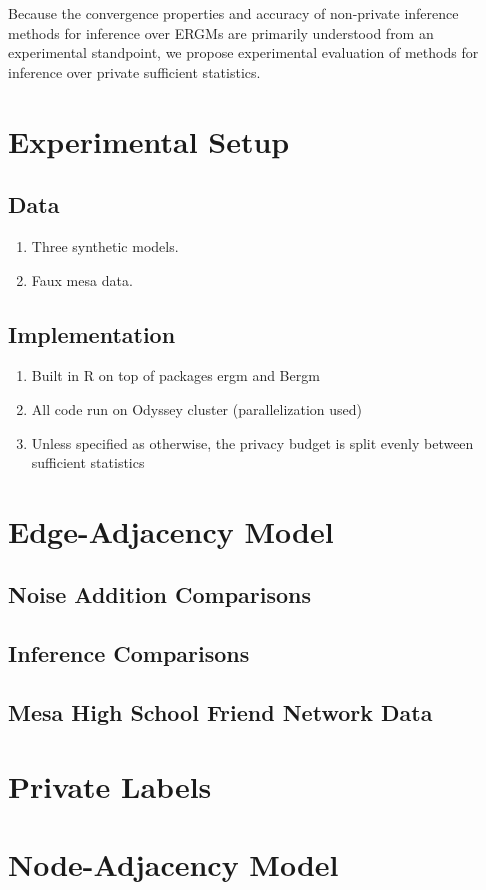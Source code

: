  Because the convergence properties and accuracy of non-private inference methods for inference over ERGMs are primarily understood from an experimental standpoint, we propose experimental evaluation of methods for inference over private sufficient statistics.
 
 \section{Experimental Setup}
 
 \subsection*{Data}
 \begin{enumerate}
 	\item  Three synthetic models.
 	\item Faux mesa data.
 \end{enumerate}

\subsection*{Implementation}
\begin{enumerate}
	\item Built in R on top of packages ergm and Bergm
	\item All code run on Odyssey cluster (parallelization used)
	\item Unless specified as otherwise, the privacy budget is split evenly between sufficient statistics
\end{enumerate}
 
 \section{Edge-Adjacency Model}
 
 \subsection{Noise Addition Comparisons}
 
 \subsection{Inference Comparisons}
 
 \subsection{Mesa High School Friend Network Data}
 
 \section{Private Labels}
 
 \section{Node-Adjacency Model}
 